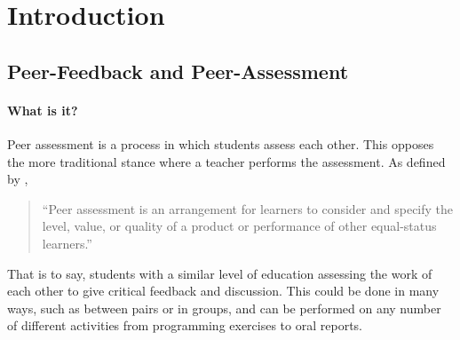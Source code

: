 \documentclass[sigplan,10pt,review]{acmart}\settopmatter{printfolios=true}
\begin{document}




\maketitle


\section{Introduction}





\cite{GroHamKumMaaMcGrShaWelZan_STEM-HE-2017}
\cite{McGregor_BSc-2017}


\subsection{Peer-Feedback and Peer-Assessment}


\paragraph{What is it?}

Peer assessment is a process in which students assess each other. This
opposes the more traditional stance where a teacher performs the
assessment. As defined by \citet{topping_peer_2009},
\begin{quote}
  ``Peer assessment is an arrangement for learners to consider and
  specify the level, value, or quality of a product or performance of
  other equal-status learners.''
\end{quote}
That is to say, students with a similar level of education assessing
the work of each other to give critical feedback and discussion. This
could be done in many ways, such as between pairs or in groups, and
can be performed on any number of different activities from
programming exercises to oral reports.
\end{document}
